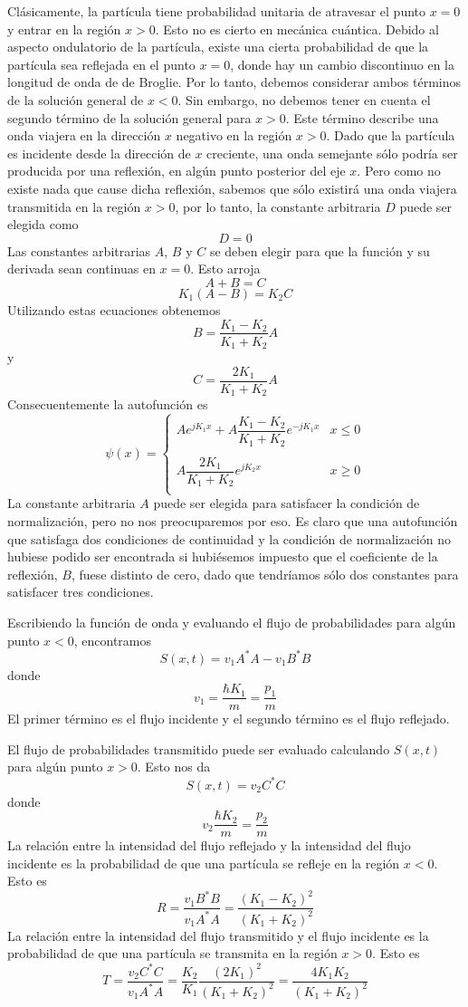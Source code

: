 \documentclass[12pt,a4paper]{article}
\begin{document}
Clásicamente, la partícula tiene probabilidad unitaria de atravesar el punto $x=0$ y entrar en la región $x>0$. Esto no es cierto en mecánica cuántica. Debido al aspecto ondulatorio de la partícula, existe una cierta probabilidad de que la partícula sea reflejada en el punto $x=0$, donde hay un cambio discontinuo en la longitud de onda de de Broglie. Por lo tanto, debemos considerar ambos términos de la solución general de $x<0$. Sin embargo, no debemos tener en cuenta el segundo término de la solución general para $x>0$. Este término describe una onda viajera en la dirección $x$ negativo en la región $x>0$. Dado que la partícula es incidente desde la dirección de $x$ creciente, una onda semejante sólo podría ser producida por una reflexión, en algún punto posterior del eje $x$. Pero como no existe nada que cause dicha reflexión, sabemos que sólo existirá una onda viajera transmitida en la región $x>0$, por lo tanto, la constante arbitraria $D$ puede ser elegida como
\[ D=0 \]
Las constantes arbitrarias $A$, $B$ y $C$ se deben elegir para que la función y su derivada sean continuas en $x=0$. Esto arroja
\[ A+B=C \]
\[ K_{1}(A-B)=K_{2}C \]
Utilizando estas ecuaciones obtenemos
\[ B=\frac{K_{1}-K_{2}}{K_{1}+K_{2}} A \]
y
\[ C=\frac{2K_{1}}{K_{1}+K_{2}}A \]
Consecuentemente la autofunción es
\[
\psi(x)=
\left\{
\begin{array}{ll}
Ae^{jK_{1}x}+A\dfrac{K_{1}-K_{2}}{K_{1}+K_{2}}e^{-jK_{1}x} & x \leq 0 \\
 & \\
A \dfrac{2K_{1}}{K_{1}+K_{2}} e^{jK_{2}x} & x \geq 0 \\
\end{array}
\right.
\]
La constante arbitraria $A$ puede ser elegida para satisfacer la condición de normalización, pero no nos preocuparemos por eso. Es claro que una autofunción que satisfaga dos condiciones de continuidad y la condición de normalización no hubiese podido ser encontrada si hubiésemos impuesto que el coeficiente de la reflexión, $B$, fuese distinto de cero, dado que tendríamos sólo dos constantes para satisfacer tres condiciones.

Escribiendo la función de onda y evaluando el flujo de probabilidades para algún punto $x<0$, encontramos
\[ S(x,t)=v_{1}A^{\ast}A-v_{1}B^{\ast}B \]
donde
\[ v_{1} =\frac{\hbar K_{1}}{m}=\frac{p_{1}}{m}\]
El primer término es el flujo incidente y el segundo término es el flujo reflejado.

El flujo de probabilidades transmitido puede ser evaluado calculando $S(x,t)$ para algún punto $x>0$. Esto nos da
\[ S(x,t)=v_{2}C^{\ast}C \]
donde
\[ v_{2}\frac{\hbar K_{2}}{m}=\frac{p_{2}}{m} \]
La relación entre la intensidad del flujo reflejado y la intensidad del flujo incidente es la probabilidad de que una partícula se refleje en la región $x<0$. Esto es
\[ R=\frac{v_{1}B^{\ast}B}{v_{1}A^{\ast}A}=\frac{(K_{1}-K_{2})^{2}}{(K_{1}+K_{2})^{2}} \]
La relación entre la intensidad del flujo transmitido y el flujo incidente es la probabilidad de que una partícula se transmita en la región $x>0$. Esto es
\[ T=\frac{v_{2}C^{\ast}C}{v_{1}A^{\ast}A}=\frac{K_{2}}{K_{1}} \frac{(2K_{1})^{2}}{(K_{1}+K_{2})^{2}}=\frac{4K_{1}K_{2}}{(K_{1}+K_{2})^{2}} \]
\end{document}
